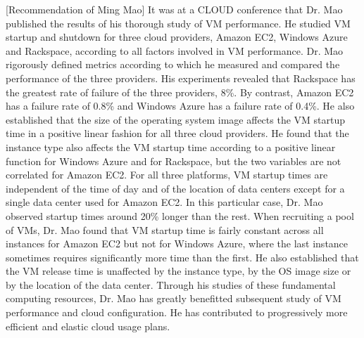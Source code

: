 \documentclass[a4paper,10pt]{article}
\begin{document}
\begin{letter}[Recommendation of Ming Mao]
It was at a CLOUD conference that  Dr. Mao published the results of his thorough
study of  VM performance.  He studied  VM startup and  shutdown for  three cloud
providers, Amazon  EC2, Windows  Azure and Rackspace,  according to  all factors
involved  in VM  performance. Dr.  Mao rigorously  defined metrics  according to
which he  measured and  compared the  performance of  the three  providers.  His
experiments revealed  that Rackspace  has the  greatest rate  of failure  of the
three providers, 8\%.  By contrast, Amazon EC2  has a failure rate  of 0.8\% and
Windows Azure has a failure rate of  0.4\%. He also established that the size of
the operating  system image  affects the  VM startup time  in a  positive linear
fashion for  all three  cloud providers.  He found that  the instance  type also
affects the VM startup time according  to a positive linear function for Windows
Azure and  for Rackspace, but  the two variables  are not correlated  for Amazon
EC2.  For all three  platforms, VM startup times are independent  of the time of
day and of the location of data centers except for a single data center used for
Amazon EC2. In this particular case, Dr.  Mao observed startup times around 20\%
longer than  the rest.  When recruiting  a pool of  VMs, Dr.  Mao found  that VM
startup time is fairly constant across all  instances for Amazon EC2 but not for
Windows Azure,  where the  last instance  sometimes requires  significantly more
time than the first.  He also established that the VM release time is unaffected
by the  instance type,  by the  OS image  size or  by the  location of  the data
center. Through  his studies of  these fundamental computing resources,  Dr. Mao
has  greatly   benefitted  subsequent   study  of   VM  performance   and  cloud
configuration.  He has  contributed to progressively more  efficient and elastic
cloud usage plans.  


\end{letter}
\end{document}
